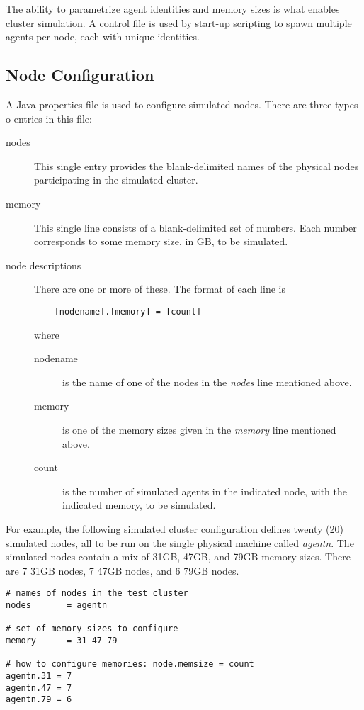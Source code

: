     The ability to parametrize agent identities and memory sizes is what enables 
    cluster simulation.  A control file is used by start-up scripting
    to spawn multiple agents per node, each with unique identities. 

    \subsection{Node Configuration}

    A Java properties file is used to configure
    simulated nodes.  There are three types o entries in this file:
    \begin{description}
      \item[nodes] This single entry provides the blank-delimited names of the physical nodes
        participating in the simulated cluster.
      \item[memory] This single line consists of a blank-delimited set
        of numbers.  Each number corresponds to some memory size, in
        GB, to be simulated.
      \item[node descriptions] There are one or more of these.  The format
        of each line is
\begin{verbatim}
    [nodename].[memory] = [count]
\end{verbatim}
        where
        \begin{description}
          \item[nodename] is the name of one of the nodes in the {\em nodes}
            line mentioned above.
          \item[memory] is one of the memory sizes given in the {\em memory}
            line mentioned above.
          \item[count] is the number of simulated agents in the indicated
            node, with the indicated memory, to be simulated.
        \end{description}
      \end{description}

      For example, the following simulated cluster configuration defines twenty (20)
      simulated nodes, all to be run on the single physical machine called {\em agentn}.
      The simulated nodes contain a mix of 31GB, 47GB, and 79GB memory sizes.  There
      are 7 31GB nodes, 7 47GB nodes, and 6 79GB nodes.
\begin{verbatim}
# names of nodes in the test cluster
nodes       = agentn

# set of memory sizes to configure
memory      = 31 47 79

# how to configure memories: node.memsize = count
agentn.31 = 7
agentn.47 = 7
agentn.79 = 6
\end{verbatim}

